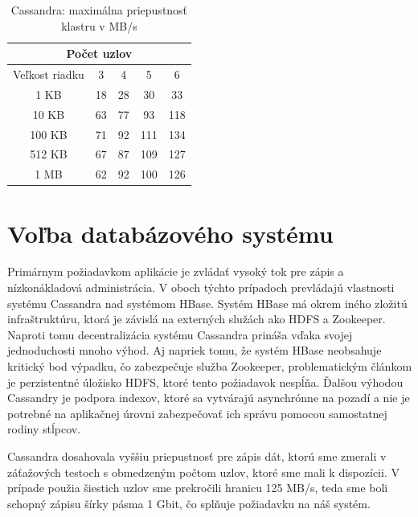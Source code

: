 \documentclass[11pt,twoside,a4paper]{book}
\begin{document}
\begin{table}[htp]
\begin{center}
\begin{tabular}{|c|c|c|c|c|}
\hline
\multicolumn{5}{|c|}{Počet uzlov}  \\
\hline Veľkost riadku & 3 & 4 & 5 & 6\\ 
\hline
\hline 1 KB & 18 & 28 & 30 & 33\\ 
\hline 10 KB & 63 & 77 & 93 & 118 \\ 
\hline 100 KB & 71 & 92 & 111 & 134\\ 
\hline 512 KB & 67 & 87 & 109 & 127\\  
\hline 1 MB & 62 & 92 & 100 & 126\\ 
\hline
\end{tabular} 
\end{center}
\caption{Cassandra: maximálna priepustnosť klastru v MB/s}
\label{tab:CPerf1}
\end{table}





\section{Voľba databázového systému}

Primárnym požiadavkom aplikácie je zvládať vysoký tok pre zápis a nízkonákladová administrácia. V oboch týchto prípadoch prevládajú vlastnosti systému Cassandra nad systémom HBase. Systém HBase má okrem iného zložitú infraštruktúru, ktorá je závislá na externých služách ako HDFS a Zookeeper. Naproti tomu decentralizácia systému Cassandra prináša vďaka svojej jednoduchosti mnoho výhod. Aj napriek tomu, že systém HBase neobsahuje kritický bod výpadku, čo zabezpečuje služba Zookeeper, problematickým článkom je perzistentné úložisko HDFS, ktoré tento požiadavok nespĺňa. Ďalšou výhodou Cassandry je podpora indexov, ktoré sa vytvárajú asynchrónne na pozadí a nie je potrebné na aplikačnej úrovni zabezpečovať ich správu pomocou samostatnej rodiny stĺpcov. 

Cassandra dosahovala vyššiu priepustnosť pre zápis dát, ktorú sme zmerali v záťažových testoch s obmedzeným počtom uzlov, ktoré sme mali k dispozícii. V prípade použia šiestich uzlov sme prekročili hranicu 125 MB/s, teda sme boli schopný zápisu šírky pásma 1 Gbit, čo splňuje požiadavku na náš systém.
\end{document}
